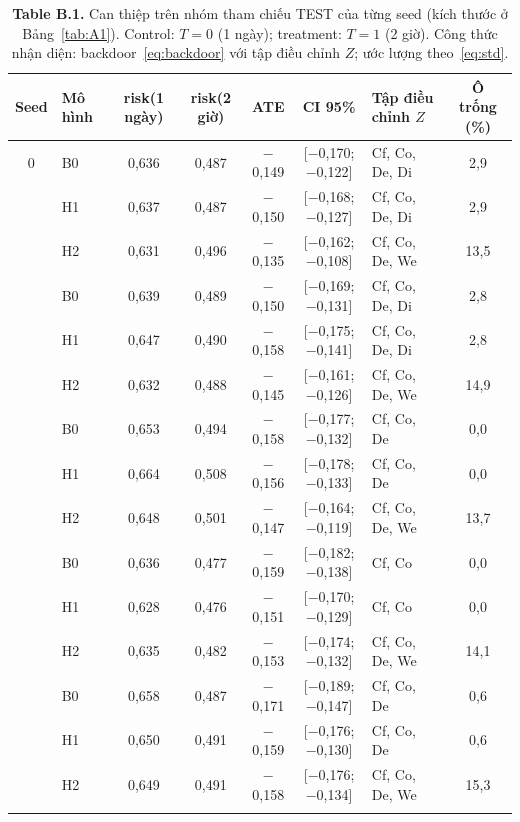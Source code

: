 \documentclass[pdflatex,sn-mathphys-num]{sn-jnl}%
\begin{document}
\begin{table}[t]
\caption{\textbf{Table B.1.} Can thiệp trên nhóm tham chiếu TEST của từng seed (kích thước ở Bảng~\ref{tab:A1}). Control: $T=0$ (1 ngày); treatment: $T=1$ (2 giờ). Công thức nhận diện: backdoor~\eqref{eq:backdoor} với tập điều chỉnh $Z$; ước lượng theo~\eqref{eq:std}.}\label{tab:B1}
\setlength{\tabcolsep}{3pt}
\begin{tabular}{@{}clccccL{2.0cm}c@{}}
\toprule
Seed & Mô hình & risk(1 ngày) & risk(2 giờ) & ATE & CI 95\% & Tập điều chỉnh $Z$ & Ô trống (\%) \\
 & B0 & 0,636 & 0,487 & $-$0,149 & [$-$0,170; $-$0,122] & Cf, Co, De, Di & 2,9 \\
 & H1 & 0,637 & 0,487 & $-$0,150 & [$-$0,168; $-$0,127] & Cf, Co, De, Di & 2,9 \\
 & H2 & 0,631 & 0,496 & $-$0,135 & [$-$0,162; $-$0,108] & Cf, Co, De, We & 13,5 \\
 & B0 & 0,639 & 0,489 & $-$0,150 & [$-$0,169; $-$0,131] & Cf, Co, De, Di & 2,8 \\
 & H1 & 0,647 & 0,490 & $-$0,158 & [$-$0,175; $-$0,141] & Cf, Co, De, Di & 2,8 \\
 & H2 & 0,632 & 0,488 & $-$0,145 & [$-$0,161; $-$0,126] & Cf, Co, De, We & 14,9 \\
 & B0 & 0,653 & 0,494 & $-$0,158 & [$-$0,177; $-$0,132] & Cf, Co, De & 0,0 \\
 & H1 & 0,664 & 0,508 & $-$0,156 & [$-$0,178; $-$0,133] & Cf, Co, De & 0,0 \\
 & H2 & 0,648 & 0,501 & $-$0,147 & [$-$0,164; $-$0,119] & Cf, Co, De, We & 13,7 \\
 & B0 & 0,636 & 0,477 & $-$0,159 & [$-$0,182; $-$0,138] & Cf, Co & 0,0 \\
 & H1 & 0,628 & 0,476 & $-$0,151 & [$-$0,170; $-$0,129] & Cf, Co & 0,0 \\
 & H2 & 0,635 & 0,482 & $-$0,153 & [$-$0,174; $-$0,132] & Cf, Co, De, We & 14,1 \\
 & B0 & 0,658 & 0,487 & $-$0,171 & [$-$0,189; $-$0,147] & Cf, Co, De & 0,6 \\
 & H1 & 0,650 & 0,491 & $-$0,159 & [$-$0,176; $-$0,130] & Cf, Co, De & 0,6 \\
 & H2 & 0,649 & 0,491 & $-$0,158 & [$-$0,176; $-$0,134] & Cf, Co, De, We & 15,3 \\
\botrule
\end{tabular}
\end{table}
\end{document}
